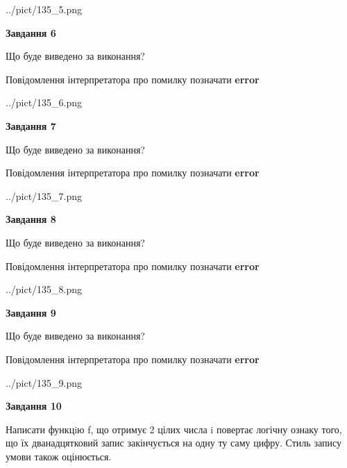 \documentclass[12pt, ukrainian]{article}
\begin{document}
{\begin {large}
\begin{center}
	{../pict/135_5.png}
\end{center}
\newpage

{\begin {center}\textbf{Завдання 6}\end {center}}\par
Що буде виведено за виконання? \par
Повідомлення інтерпретатора про помилку позначати \textbf{error}

\begin{center}
	{../pict/135_6.png}
\end{center}
\newpage

{\begin {center}\textbf{Завдання 7}\end {center}}\par
Що буде виведено за виконання? \par
Повідомлення інтерпретатора про помилку позначати \textbf{error}

\begin{center}
	{../pict/135_7.png}
\end{center}
\newpage

{\begin {center}\textbf{Завдання 8}\end {center}}\par
Що буде виведено за виконання? \par
Повідомлення інтерпретатора про помилку позначати \textbf{error}

\begin{center}
	{../pict/135_8.png}
\end{center}
\newpage

{\begin {center}\textbf{Завдання 9}\end {center}}\par
Що буде виведено за виконання? \par
Повідомлення інтерпретатора про помилку позначати \textbf{error}

\begin{center}
	{../pict/135_9.png}
\end{center}
\newpage

{\begin {center}\textbf{Завдання 10}\end {center}}\par

Написати функцiю f, що отримує 2 цілих числа i повертає логічну ознаку того, що їх дванадцятковий запис закінчується на одну ту саму цифру. Стиль запису умови також оцінюється.\par
\newpage

\end {large}}
\end{document}
